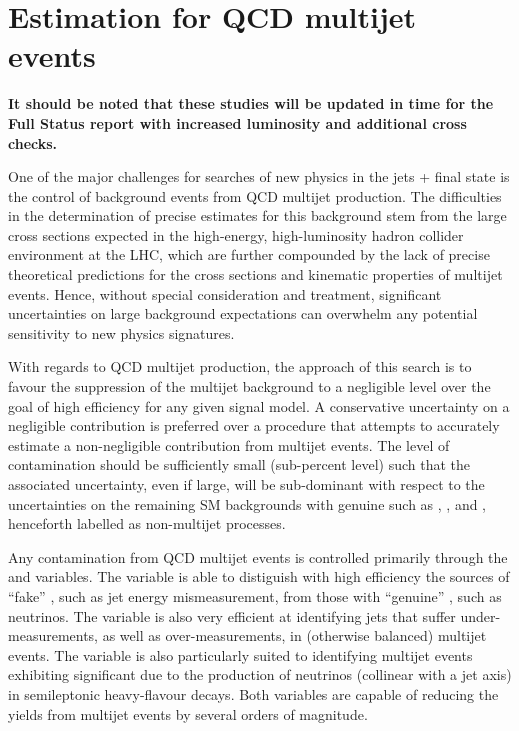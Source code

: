 
\def\rmhtmet{\mbox{$\mathcal{R}$}\xspace}

\section{Estimation for QCD multijet events \label{sec:qcd}}

{\bf It should be noted that these studies will be updated in time for
  the Full Status report with increased luminosity and additional
  cross checks. }

One of the major challenges for searches of new physics in the jets +
\met final state is the control of background events from QCD multijet
production. The difficulties in the determination of precise estimates
for this background stem from the large cross sections expected in the
high-energy, high-luminosity hadron collider environment at the LHC,
which are further compounded by the lack of precise theoretical
predictions for the cross sections and kinematic properties of
multijet events. Hence, without special consideration and treatment,
significant uncertainties on large background expectations can
overwhelm any potential sensitivity to new physics signatures.

With regards to QCD multijet production, the approach of this search
is to favour the suppression of the multijet background to a
negligible level over the goal of high efficiency for any given signal
model. A conservative uncertainty on a negligible contribution is
preferred over a procedure that attempts to accurately estimate a
non-negligible contribution from multijet events. The level of
contamination should be sufficiently small (\ie sub-percent level)
such that the associated uncertainty, even if large, will be
sub-dominant with respect to the uncertainties on the remaining SM
backgrounds with genuine \met such as \wj, \znunu, and \ttbar,
henceforth labelled as non-multijet processes.

Any contamination from QCD multijet events is controlled primarily
through the \alphat and \bdphi variables. The \alphat variable is able
to distiguish with high efficiency the sources of ``fake'' \met, such
as jet energy mismeasurement, from those with ``genuine'' \met, such
as neutrinos. The \bdphi variable is also very efficient at
identifying jets that suffer under-measurements, as well as
over-measurements, in (otherwise balanced) multijet events. The
variable is also particularly suited to identifying multijet events
exhibiting significant \met due to the production of neutrinos
(collinear with a jet axis) in semileptonic heavy-flavour decays. Both
variables are capable of reducing the yields from multijet events by
several orders of magnitude.

